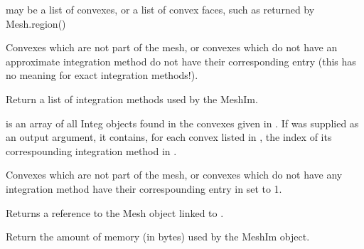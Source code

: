 \documentclass[a4paper,11pt,english]{sphinxmanual}
\begin{document}
\begin{fulllineitems}
\begin{fulllineitems}
 may be a list of convexes, or a list of convex faces, such
as returned by Mesh.region()


Convexes which are not part of the mesh, or convexes which
do not have an approximate integration method do not have
their corresponding entry (this has no meaning for exact
integration methods!).

\end{fulllineitems}


\begin{fulllineitems}
\label{\detokenize{python/cmdref_MeshIm:getfem.MeshIm.integ}}
Return a list of integration methods used by the MeshIm.

 is an array of all Integ objects found in the convexes
given in . If  was supplied as an output argument, it
contains, for each convex listed in , the index of its
correspounding integration method in .

Convexes which are not part of the mesh, or convexes which do
not have any integration method have their correspounding entry
in  set to \sphinxhyphen{}1.

\end{fulllineitems}


\begin{fulllineitems}
\label{\detokenize{python/cmdref_MeshIm:getfem.MeshIm.linked_mesh}}
Returns a reference to the Mesh object linked to .

\end{fulllineitems}


\begin{fulllineitems}
\label{\detokenize{python/cmdref_MeshIm:getfem.MeshIm.memsize}}
Return the amount of memory (in bytes) used by the MeshIm object.


\end{fulllineitems}
\end{fulllineitems}
\end{document}
